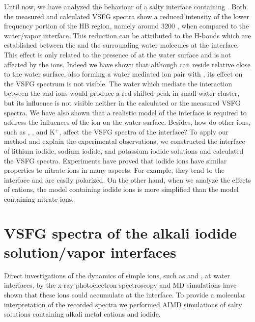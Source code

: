 Until now, we have analyzed the behaviour of a salty interface containing \LiN.
Both the measured and calculated VSFG spectra show a reduced intensity of the lower frequency portion of
the HB region, namely around 3200 \centimeter, when compared to the water/vapor interface. 
This reduction can be attributed to the H-bonds which are established between the \nitrate and the surrounding water molecules at the interface.
This effect is only related to the presence of \nitrate at the water surface and is not affected by the \Li ions.
Indeed we have shown that although \Li can reside relative close to the water surface, also forming a water mediated
ion pair with \nit, its effect on the VSFG spectrum is not visible. The water which mediate the interaction 
between the \nitrate and \Li ions would produce a red-shifted peak in small water cluster, but its influence is not visible 
neither in the calculated or the measured VSFG spectra. 
We have also shown that a realistic model of the interface is required to address the influences of the ion on the water surface.
Besides, how do other ions, such as \li, \na, and K$^+$, affect the VSFG spectra of the interface? 
To apply our method and explain the experimental observations, we constructed the interface of lithium iodide,
 sodium iodide, and potassium iodide solutions and calculated the VSFG spectra. 
Experiments have proved that iodide ions have similar properties to nitrate ions in many aspects. 
For example, they tend to the interface and are easily polarized. 
On the other hand, when we analyze the effects of cations, the model containing iodide ions is more simplified than the model containing nitrate ions.

\section{VSFG spectra of the alkali iodide solution/vapor interfaces}\label{sfg_alkali_iodide_interface} %
Direct investigations of the dynamics of simple ions, such as \I and \br, at water interfaces, 
by the x-ray photoelectron spectroscopy\cite{Ghosal2005} and MD simulations\cite{Jungwirth2001,Jungwirth2002} 
have shown that these ions could accumulate at the interface.
To provide a molecular interpretation of the recorded spectra we performed AIMD simulations of salty solutions containing alkali metal cations
and iodide. %

